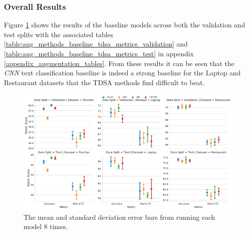 \FloatBarrier
\subsubsection{Overall Results}
Figure \ref{fig:aug_baseline_overall_scores} shows the results of the baseline models across both the validation and test splits with the associated tables \ref{table:aug_methods_baseline_tdsa_metrics_validation} and \ref{table:aug_methods_baseline_tdsa_metrics_test} in appendix \ref{appendix_augmentation_tables}. From these results it can be seen that the \textit{CNN} text classification baseline is indeed a strong baseline for the Laptop and Restaurant datasets that the TDSA methods find difficult to beat. 

\begin{figure}[ht!]
    \centering
    \includegraphics[scale=0.38]{images/augmentation/methods_performance/baseline/baseline_overall_scores.pdf}
    \caption{The mean and standard deviation error bars from running each model 8 times.}
    \label{fig:aug_baseline_overall_scores}
\end{figure}

\FloatBarrier
